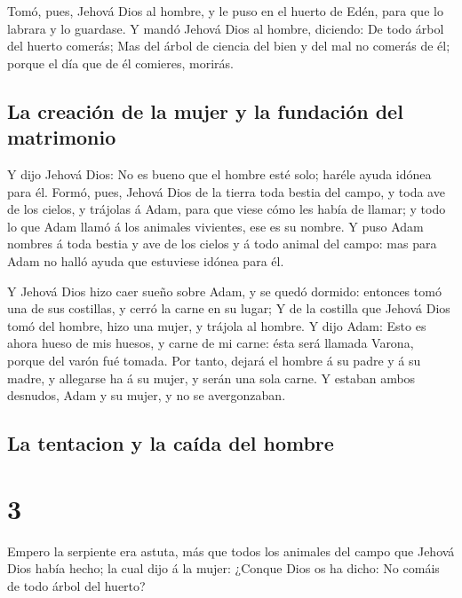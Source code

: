  Tomó, pues, Jehová Dios al hombre, y le puso en el
huerto de Edén, para que lo labrara y lo guardase.  Y
mandó Jehová Dios al hombre, diciendo: De todo árbol del huerto comerás;
 Mas del árbol de ciencia del bien y del mal no comerás
de él; porque el día que de él comieres, morirás.

\hypertarget{la-creaciuxf3n-de-la-mujer-y-la-fundaciuxf3n-del-matrimonio}{%
\subsection{La creación de la mujer y la fundación del
matrimonio}\label{la-creaciuxf3n-de-la-mujer-y-la-fundaciuxf3n-del-matrimonio}}

 Y dijo Jehová Dios: No es bueno que el hombre esté solo;
haréle ayuda idónea para él.  Formó, pues, Jehová Dios de
la tierra toda bestia del campo, y toda ave de los cielos, y trájolas á
Adam, para que viese cómo les había de llamar; y todo lo que Adam llamó
á los animales vivientes, ese es su nombre.  Y puso Adam
nombres á toda bestia y ave de los cielos y á todo animal del campo: mas
para Adam no halló ayuda que estuviese idónea para él.

 Y Jehová Dios hizo caer sueño sobre Adam, y se quedó
dormido: entonces tomó una de sus costillas, y cerró la carne en su
lugar;  Y de la costilla que Jehová Dios tomó del hombre,
hizo una mujer, y trájola al hombre.  Y dijo Adam: Esto
es ahora hueso de mis huesos, y carne de mi carne: ésta será llamada
Varona, porque del varón fué tomada.  Por tanto, dejará
el hombre á su padre y á su madre, y allegarse ha á su mujer, y serán
una sola carne.  Y estaban ambos desnudos, Adam y su
mujer, y no se avergonzaban.

\hypertarget{la-tentacion-y-la-cauxedda-del-hombre}{%
\subsection{La tentacion y la caída del
hombre}\label{la-tentacion-y-la-cauxedda-del-hombre}}

\hypertarget{section-01-3}{%
\section{3}\label{section-01-3}}

 Empero la serpiente era astuta, más que todos los
animales del campo que Jehová Dios había hecho; la cual dijo á la mujer:
¿Conque Dios os ha dicho: No comáis de todo árbol del huerto?

